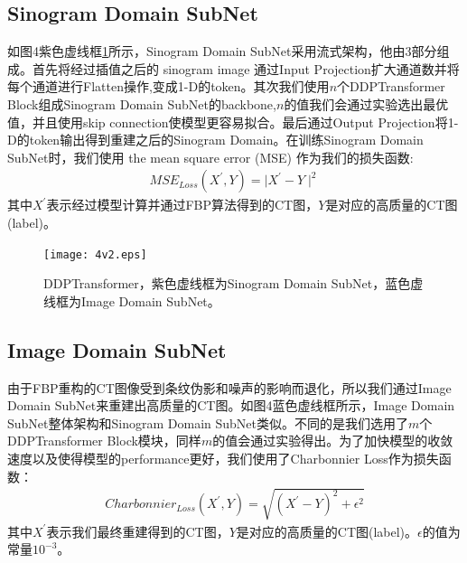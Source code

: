 \subsection{Sinogram Domain SubNet}
如图4紫色虚线框\ref{fig4v2}所示，Sinogram Domain SubNet采用流式架构，他由3部分组成。首先将经过插值之后的 sinogram image 通过Input Projection扩大通道数并将每个通道进行Flatten操作,变成1-D的token。其次我们使用$n$个DDPTransformer Block组成Sinogram Domain SubNet的backbone,$n$的值我们会通过实验选出最优值，并且使用skip connection使模型更容易拟合。最后通过Output Projection将1-D的token输出得到重建之后的Sinogram Domain。在训练Sinogram Domain SubNet时，我们使用 the mean square error (MSE) 作为我们的损失函数:
\begin{equation}
\begin{aligned}MSE_{Loss}(X^{'},Y) = \mid X^{'}-Y\mid^{2}\end{aligned}\end{equation}
其中$X^{'}$表示经过模型计算并通过FBP算法得到的CT图，$Y$是对应的高质量的CT图(label)。\par
\begin{figure}
	\centering
	\texttt{[image: 4v2.eps]}
	\caption{DDPTransformer，紫色虚线框为Sinogram Domain SubNet，蓝色虚线框为Image Domain SubNet。}
	\label{fig4v2}
\end{figure}
\subsection{Image Domain SubNet}
由于FBP重构的CT图像受到条纹伪影和噪声的影响而退化，所以我们通过Image Domain SubNet来重建出高质量的CT图。如图4蓝色虚线框所示，Image Domain SubNet整体架构和Sinogram Domain SubNet类似。不同的是我们选用了$m$个DDPTransformer Block模块，同样$m$的值会通过实验得出。为了加快模型的收敛速度以及使得模型的performance更好，我们使用了Charbonnier Loss\cite{2017Fast}作为损失函数：
\begin{equation}\begin{aligned}
Charbonnier_{Loss}(X^{'},Y) = \sqrt{(X^{'}-Y)^{2} + \epsilon^{2}} \end{aligned}
\end{equation}
其中$X^{'}$表示我们最终重建得到的CT图，$Y$是对应的高质量的CT图(label)。$\epsilon$的值为常量$10^{-3}$。\par